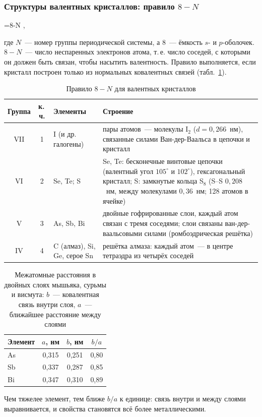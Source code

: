 \subsubsection{Структуры валентных кристаллов: правило $8-N$}

\begin{keyeq}\label{eq:8-N}
=8-N ,
\end{keyeq}
где $N$~— номер группы периодической системы, а 8~— ёмкость $s$- и
$p$-оболочек. $8-N$~— число неспаренных электронов атома, т.\,е. число
соседей, с которыми он должен быть связан, чтобы насытить валентность.
Правило выполняется, если кристалл построен только из нормальных
ковалентных связей (табл.~\ref{tab:8-N}).

\begin{table}[ht]
\centering
\caption{Правило $8-N$ для валентных кристаллов}
\label{tab:8-N}
\small
\begin{tabularx}{\textwidth}{@{}cc>{\raggedright\arraybackslash}p{25mm}>{\raggedright\arraybackslash}X@{}}
\toprule
Группа & к.\,ч. & Элементы & Строение \\
\midrule
VII & 1 & I (и др. галогены) & пары атомов~— молекулы I$_2$ ($d=0{,}266$~нм), связанные силами Ван-дер-Ваальса в цепочки и кристалл \\
VI & 2 & Se, Te; S & Se, Te: бесконечные винтовые цепочки (валентный угол $105^\circ$ и $102^\circ$), гексагональный кристалл; S: замкнутые кольца S$_8$ (S--S $0{,}208$~нм, между молекулами $0{,}36$~нм; 128 атомов в ячейке) \\
V & 3 & As, Sb, Bi & двойные гофрированные слои, каждый атом связан с тремя соседями; слои связаны ван-дер-ваальсовыми силами (ромбоэдрическая решётка) \\
IV & 4 & C (алмаз), Si, Ge, серое Sn & решётка алмаза: каждый атом~— в центре тетраэдра из четырёх соседей \\
\bottomrule
\end{tabularx}
\end{table}

\begin{table}[ht]
\centering
\caption{Межатомные расстояния в двойных слоях мышьяка, сурьмы и висмута:
$b$~— ковалентная связь внутри слоя, $a$~— ближайшее расстояние между
слоями}
\label{tab:AsSbBi}
\small
\begin{tabular}{@{}lccc@{}}
\toprule
Элемент & $a$, нм & $b$, нм & $b/a$ \\
\midrule
As & 0,315 & 0,251 & 0,80 \\
Sb & 0,337 & 0,287 & 0,85 \\
Bi & 0,347 & 0,310 & 0,89 \\
\bottomrule
\end{tabular}
\end{table}
\noindent Чем тяжелее элемент, тем ближе $b/a$ к единице: связь внутри и
между слоями выравнивается, и свойства становятся всё более
металлическими.

